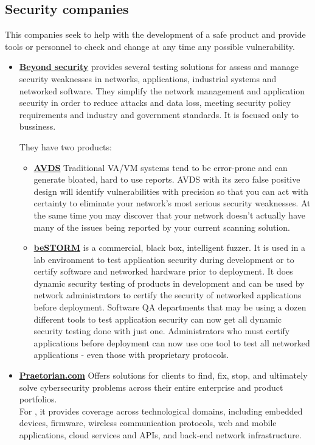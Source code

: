 \subsection{Security companies} 

This companies seek to help with the development of a safe product and provide tools or personnel to check and change at any time any possible vulnerability.
\begin{itemize}
	\item \textbf{\href{http://www.beyondsecurity.com}{Beyond security}}
	provides several testing solutions for assess and manage security weaknesses in networks, applications, industrial systems and networked software. They simplify the network management and application security in order to reduce attacks and data loss, meeting security policy requirements and industry and government standards. It is focused only to bussiness. 
	
	They have two products:
	
	\begin{itemize}
		\item \textbf{\href{http://www.beyondsecurity.com/avds.html}{AVDS}} Traditional VA/VM systems tend to be error-prone and can generate bloated, hard to use reports. AVDS with its zero false positive design will identify vulnerabilities with precision so that you can act with certainty to eliminate your network's most serious security weaknesses. At the same time you may discover that your network doesn't actually have many of the issues being reported by your current scanning solution.
		
		\item \textbf{\href{http://www.beyondsecurity.com/bestorm.html}{beSTORM}} is a commercial, black box, intelligent fuzzer. It is used in a lab environment to test application security during development or to certify software and networked hardware prior to deployment. It does dynamic security testing of products in development and can be used by network administrators to certify the security of networked applications before deployment. Software QA departments that may be using a dozen different tools to test application security can now get all dynamic security testing done with just one. Administrators who must certify applications before deployment can now use one tool to test all networked applications - even those with proprietary protocols. 		
	\end{itemize}
	
	\item \href{https://www.praetorian.com/}{\textbf{Praetorian.com}} Offers solutions for clients to find, fix, stop, and ultimately solve cybersecurity problems across their entire enterprise and product portfolios.\\
	For \IoT, it provides coverage across technological domains, including embedded devices, firmware, wireless communication protocols, web and mobile applications, cloud services and APIs, and back-end network infrastructure.


\end{itemize}
